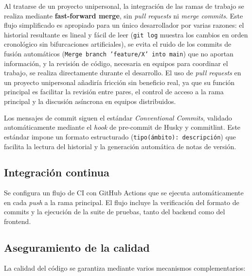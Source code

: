Al tratarse de un proyecto unipersonal, la integración de las ramas de trabajo se realiza mediante \textbf{fast-forward merge}, sin \emph{pull requests} ni \emph{merge commits}. Este flujo simplificado es apropiado para un único desarrollador por varias razones: el historial resultante es lineal y fácil de leer (\texttt{git log} muestra los cambios en orden cronológico sin bifurcaciones artificiales), se evita el ruido de los commits de fusión automáticos (\texttt{Merge branch 'feature/X' into main}) que no aportan información, y la revisión de código, necesaria en equipos para coordinar el trabajo, se realiza directamente durante el desarrollo. El uso de \emph{pull requests} en un proyecto unipersonal añadiría fricción sin beneficio real, ya que su función principal es facilitar la revisión entre pares, el control de acceso a la rama principal y la discusión asíncrona en equipos distribuidos.

Los mensajes de commit siguen el estándar \emph{Conventional Commits}, validado automáticamente mediante el \emph{hook} de pre-commit de Husky y commitlint. Este estándar impone un formato estructurado (\texttt{tipo(ámbito): descripción}) que facilita la lectura del historial y la generación automática de notas de versión.

\subsection{Integración continua}

Se configura un flujo de CI con GitHub Actions que se ejecuta automáticamente en cada \emph{push} a la rama principal. El flujo incluye la verificación del formato de commits y la ejecución de la suite de pruebas, tanto del backend como del frontend.

\subsection{Aseguramiento de la calidad}

La calidad del código se garantiza mediante varios mecanismos complementarios:

